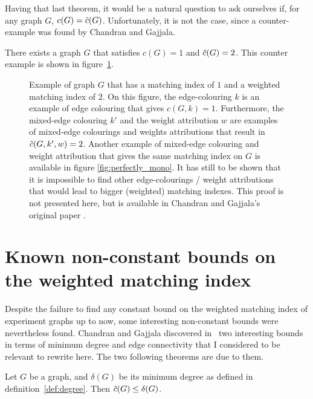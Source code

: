 Having that last theorem, it would be a natural question to ask ourselves if, for any graph $G$, $c(G) = \Tilde{c}(G)$.
Unfortunately, it is not the case, since a counter-example was found by Chandran and Gajjala. \cite{chandran}

\begin{observation}
    \label{obs:c_not_c_tilde}
    There exists a graph $G$ that satisfies $c(G) = 1$ and $\Tilde{c}(G) = 2$.
    This counter example is shown in figure~\ref{fig:proof_c_not_c_tilde}.
\end{observation}

\begin{figure}[H]
    \caption{Example of graph $G$ that has a matching index of $1$ and a weighted matching index of $2$.
        On this figure, the edge-colouring $k$ is an example of edge colouring that gives $c(G, k) = 1$.
        Furthermore, the mixed-edge colouring $k'$ and the weight attribution $w$ are examples of mixed-edge colourings and weights attributions that result in $\Tilde{c}(G, k', w) = 2$.
        Another example of mixed-edge colouring and weight attribution that gives the same matching index on $G$ is available in figure \ref{fig:perfectly_mono}.
        It has still to be shown that it is impossible to find other edge-colourings / weight attributions that would lead to bigger (weighted) matching indexes.
        This proof is not presented here, but is available in Chandran and Gajjala's original paper \cite{chandran}.}
    \label{fig:proof_c_not_c_tilde}
\end{figure}


\section{Known non-constant bounds on the weighted matching index}
\label{sec:known-non-constant-bounds}

Despite the failure to find any constant bound on the weighted matching index of experiment graphs up to now, some interesting non-constant bounds were nevertheless found.
Chandran and Gajjala discovered in~\cite{chandran} two interesting bounds in terms of minimum degree and edge connectivity that I considered to be relevant to rewrite here.
The two following theorems are due to them.

\begin{lemma}
    \label{lem:bound_min_degree}
    Let $G$ be a graph, and $\delta(G)$ be its minimum degree as defined in definition~\ref{def:degree}.
    Then $\Tilde{c}(G) \leq \delta(G)$.
\end{lemma}

